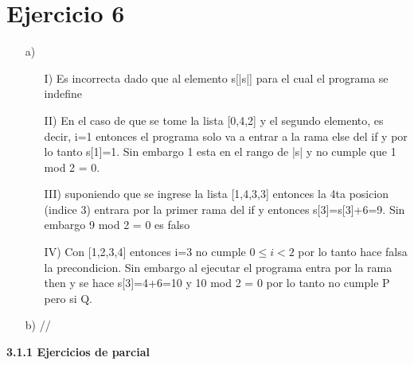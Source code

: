 \documentclass{article}
\begin{document}
{\section*{Ejercicio 6}
\begin{itemize}
    \item [a) ]
    \begin{itemize}
        \item [I)] Es incorrecta dado que al elemento s[|s|] para el cual el programa se indefine
        \item [II)] En el caso de que se tome la lista [0,4,2]  y el segundo elemento, es decir, i=1 entonces el programa solo va a entrar a la rama else del if y por lo tanto s[1]=1. Sin embargo 1 esta en el rango de |s| y no cumple que 1 mod 2 = 0.
        \item [III) ] suponiendo que se ingrese la lista [1,4,3,3] entonces la 4ta posicion (indice 3) entrara por la primer rama del if y entonces s[3]=s[3]+6=9. Sin embargo 9 mod 2 = 0 es falso
        \item [IV) ] Con [1,2,3,4] entonces i=3 no cumple $0\leq i<2$ por lo tanto hace falsa la precondicion. Sin embargo al ejecutar el programa entra por la rama then y se hace s[3]=4+6=10 y 10 mod 2 = 0 por lo tanto no cumple P pero si Q.
    \end{itemize}
    \item [b)] //
\end{itemize}
\huge{\textbf{3.1.1 Ejercicios de parcial}}
}
\end{document}
